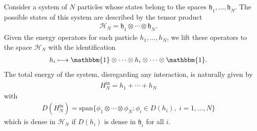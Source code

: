 Consider a system of $N$ particles whose states belong to the spaces $\mathfrak{h}_1,
\ldots,\mathfrak{h}_N$. The possible states of this system are described by the tensor product
\begin{align*}
	\mathcal{H}_N = \mathfrak{h}_1 \otimes \cdots \otimes \mathfrak{h}_N.
\end{align*}
Given the energy operators for each particle $h_1,\ldots,h_N$, we lift these operators to
the space $\mathcal{H}_N$ with the identification
\begin{align*}
	h_i \longmapsto \mathbbm{1} \otimes \cdots \otimes h_i \otimes \cdots \otimes \mathbbm{1}.
\end{align*}
The total energy of the system, disregarding any interaction, is naturally given by
\begin{align}
	\label{free-hamiltonian}
	H_N^{\mathrm{in}} = h_1 + \cdots + h_N
\end{align}
with
\begin{align*}
	D(H_N^{\mathrm{in}}) = \mathrm{span}\{ \phi_1 \otimes \cdots \otimes \phi_N : \phi_i \in D(h_i), \; i=1,\ldots,N \}
\end{align*}
which is dense in $\mathcal{H}_N$ if $D(h_i)$ is dense in $\mathfrak{h}_i$ for all $i$.

